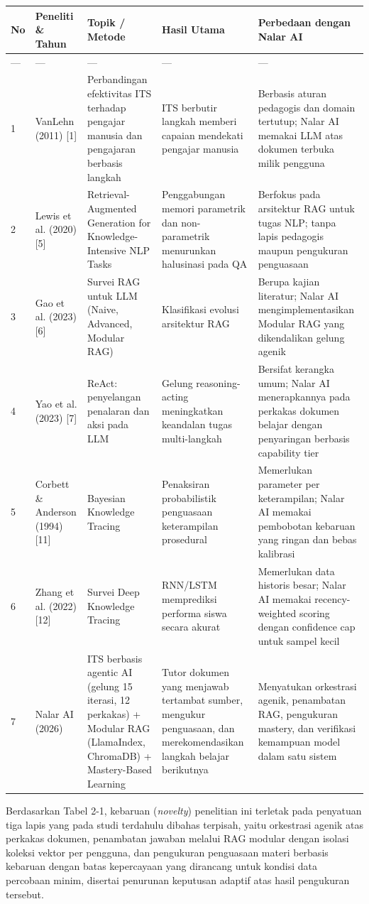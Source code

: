 \documentclass[12pt,a4paper]{article}
\begin{document}
\begin{table}[h]
\centering
\begin{tabular}{lllll}
\toprule
No & Peneliti \& Tahun & Topik / Metode & Hasil Utama & Perbedaan dengan Nalar AI \\
\midrule
--- & --- & --- & --- & --- \\
1 & VanLehn (2011) {[}1{]} & Perbandingan efektivitas ITS terhadap pengajar manusia dan pengajaran berbasis langkah & ITS berbutir langkah memberi capaian mendekati pengajar manusia & Berbasis aturan pedagogis dan domain tertutup; Nalar AI memakai LLM atas dokumen terbuka milik pengguna \\
2 & Lewis et al. (2020) {[}5{]} & Retrieval-Augmented Generation for Knowledge-Intensive NLP Tasks & Penggabungan memori parametrik dan non-parametrik menurunkan halusinasi pada QA & Berfokus pada arsitektur RAG untuk tugas NLP; tanpa lapis pedagogis maupun pengukuran penguasaan \\
3 & Gao et al. (2023) {[}6{]} & Survei RAG untuk LLM (Naive, Advanced, Modular RAG) & Klasifikasi evolusi arsitektur RAG & Berupa kajian literatur; Nalar AI mengimplementasikan Modular RAG yang dikendalikan gelung agenik \\
4 & Yao et al. (2023) {[}7{]} & ReAct: penyelangan penalaran dan aksi pada LLM & Gelung reasoning-acting meningkatkan keandalan tugas multi-langkah & Bersifat kerangka umum; Nalar AI menerapkannya pada perkakas dokumen belajar dengan penyaringan berbasis capability tier \\
5 & Corbett \& Anderson (1994) {[}11{]} & Bayesian Knowledge Tracing & Penaksiran probabilistik penguasaan keterampilan prosedural & Memerlukan parameter per keterampilan; Nalar AI memakai pembobotan kebaruan yang ringan dan bebas kalibrasi \\
6 & Zhang et al. (2022) {[}12{]} & Survei Deep Knowledge Tracing & RNN/LSTM memprediksi performa siswa secara akurat & Memerlukan data historis besar; Nalar AI memakai recency-weighted scoring dengan confidence cap untuk sampel kecil \\
7 & Nalar AI (2026) & ITS berbasis agentic AI (gelung 15 iterasi, 12 perkakas) + Modular RAG (LlamaIndex, ChromaDB) + Mastery-Based Learning & Tutor dokumen yang menjawab tertambat sumber, mengukur penguasaan, dan merekomendasikan langkah belajar berikutnya & Menyatukan orkestrasi agenik, penambatan RAG, pengukuran mastery, dan verifikasi kemampuan model dalam satu sistem \\
\bottomrule
\end{tabular}
\end{table}
Berdasarkan Tabel 2-1, kebaruan (\textit{novelty}) penelitian ini terletak pada penyatuan tiga lapis yang pada studi terdahulu dibahas terpisah, yaitu orkestrasi agenik atas perkakas dokumen, penambatan jawaban melalui RAG modular dengan isolasi koleksi vektor per pengguna, dan pengukuran penguasaan materi berbasis kebaruan dengan batas kepercayaan yang dirancang untuk kondisi data percobaan minim, disertai penurunan keputusan adaptif atas hasil pengukuran tersebut.
\end{document}
